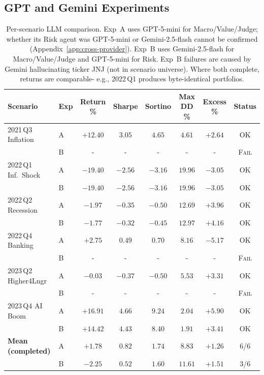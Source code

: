\documentclass{article}
\begin{document}
\subsection{GPT and Gemini Experiments}
\label{app:llm-comparison}

\begin{table}[H]
\centering
\small
\begin{tabular}{@{}llcccccc@{}}
\toprule
\textbf{Scenario} & \textbf{Exp} & \textbf{Return \%} & \textbf{Sharpe} & \textbf{Sortino} & \textbf{Max DD \%} & \textbf{Excess \%} & \textbf{Status} \\
\midrule
2021\,Q3 Inflation   & A & $+12.40$ & $3.05$ & $4.65$ & $4.61$ & $+2.64$ & OK \\
                      & B & -       & -     & -     & -     & -      & \textsc{Fail} \\
\midrule
2022\,Q1 Inf.\ Shock & A & $-19.40$ & $-2.56$ & $-3.16$ & $19.96$ & $-3.05$ & OK \\
                      & B & $-19.40$ & $-2.56$ & $-3.16$ & $19.96$ & $-3.05$ & OK \\
\midrule
2022\,Q2 Recession   & A & $-1.97$  & $-0.35$ & $-0.50$ & $12.69$ & $+3.96$ & OK \\
                      & B & $-1.77$  & $-0.32$ & $-0.45$ & $12.97$ & $+4.16$ & OK \\
\midrule
2022\,Q4 Banking     & A & $+2.75$  & $0.49$  & $0.70$  & $8.16$  & $-5.17$ & OK \\
                      & B & -       & -      & -      & -      & -      & \textsc{Fail} \\
\midrule
2023\,Q2 Higher4Lngr & A & $-0.03$  & $-0.37$ & $-0.50$ & $5.53$  & $+3.31$ & OK \\
                      & B & -       & -      & -      & -      & -      & \textsc{Fail} \\
\midrule
2023\,Q4 AI Boom     & A & $+16.91$ & $4.66$  & $9.24$  & $2.04$  & $+5.90$ & OK \\
                      & B & $+14.42$ & $4.43$  & $8.40$  & $1.91$  & $+3.41$ & OK \\
\midrule
\textbf{Mean (completed)} & A & $+1.78$ & $0.82$ & $1.74$ & $8.83$ & $+1.26$ & 6/6 \\
                           & B & $-2.25$ & $0.52$ & $1.60$ & $11.61$ & $+1.51$ & 3/6 \\
\bottomrule
\end{tabular}
\vspace{4pt}
\setlength{\belowcaptionskip}{-4pt}
\caption{Per-scenario LLM comparison. Exp~A uses GPT-5-mini for Macro/Value/Judge; whether its Risk agent was GPT-5-mini or Gemini-2.5-flash cannot be confirmed (Appendix~\ref{app:cross-provider}). Exp~B uses Gemini-2.5-flash for Macro/Value/Judge and GPT-5-mini for Risk. Exp~B failures are caused by Gemini hallucinating ticker JNJ (not in scenario universe). Where both complete, returns are comparable- e.g., 2022\,Q1 produces byte-identical portfolios.}
\label{tab:llm-comparison}
\end{table}
\end{document}
